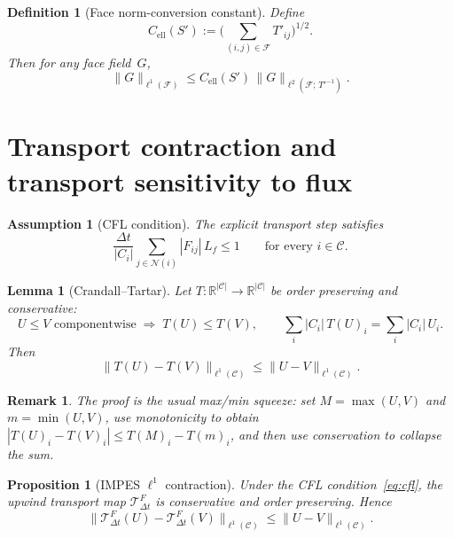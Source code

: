 \documentclass[11pt]{article}
\newtheorem{proposition}[theorem]{Proposition}
\newtheorem{lemma}[theorem]{Lemma}
\newtheorem{definition}[theorem]{Definition}
\newtheorem{assumption}[theorem]{Assumption}
\newtheorem*{remark}{Remark}
\begin{document}
\begin{definition}[Face norm-conversion constant]\label{def:cell}
Define
\begin{equation}\label{eq:cell}
  C_{\mathrm{ell}}(S')
    := \biggl(\sum_{(i,j)\in\mathcal{F}} T'_{ij}\biggr)^{1/2}.
\end{equation}
Then for any face field~$G$,
\begin{equation}\label{eq:norm-convert}
  \|G\|_{\ell^1(\mathcal{F})}
    \le C_{\mathrm{ell}}(S')\,\|G\|_{\ell^2(\mathcal{F};\,T'^{-1})}.
\end{equation}
\end{definition}

\section{Transport contraction and transport sensitivity to flux}
\label{sec:transport}

\begin{assumption}[CFL condition]\label{ass:cfl}
The explicit transport step satisfies
\begin{equation}\label{eq:cfl}
  \frac{\Delta t}{|C_i|}\sum_{j\in\mathcal{N}(i)} |F_{ij}|\,L_f \le 1
  \qquad\text{for every } i\in\mathcal{C}.
\end{equation}
\end{assumption}

\begin{lemma}[Crandall--Tartar]\label{lem:CT}
Let $T:\mathbb{R}^{|\mathcal{C}|}\to\mathbb{R}^{|\mathcal{C}|}$ be order
preserving and conservative:
\[
  U\le V \text{ componentwise}
  \;\Longrightarrow\; T(U)\le T(V),\qquad
  \sum_i |C_i|\,T(U)_i = \sum_i |C_i|\,U_i.
\]
Then
\[
  \|T(U)-T(V)\|_{\ell^1(\mathcal{C})}
    \le \|U-V\|_{\ell^1(\mathcal{C})}.
\]
\end{lemma}

\begin{remark}
The proof is the usual max/min squeeze: set $M=\max(U,V)$ and
$m=\min(U,V)$, use monotonicity to obtain
$|T(U)_i - T(V)_i|\le T(M)_i - T(m)_i$, and then use conservation to
collapse the sum.
\end{remark}

\begin{proposition}[IMPES $\ell^1$ contraction]\label{prop:contraction}
Under the CFL condition~\eqref{eq:cfl}, the upwind transport map
$\mathcal{T}^F_{\Delta t}$ is conservative and order preserving.  Hence
\[
  \|\mathcal{T}^F_{\Delta t}(U)
    - \mathcal{T}^F_{\Delta t}(V)\|_{\ell^1(\mathcal{C})}
    \le \|U - V\|_{\ell^1(\mathcal{C})}.
\]
\end{proposition}
\end{document}
